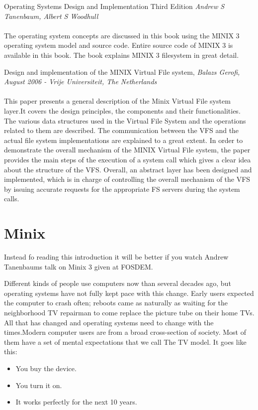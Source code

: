 Operating Systems Design and Implementation Third Edition { \em Andrew S Tanenbaum, Albert S Woodhull }\cite{ast}
\\
\\
The operating system concepts are discussed in this book using the MINIX 3 operating system model and source code. Entire source code of MINIX 3 is available in this book. The book explains MINIX 3 filesystem in great detail. 


\vspace{10mm}
 Design and implementation of the MINIX Virtual File system, { \em Balazs Gerofi, August 2006 - Vrije Universiteit, The Netherlands
}\cite{vfs}
\\
\\
This paper presents a general description of the Minix Virtual File system layer.It covers the design principles, the components and their functionalities.
The various data structures used in the Virtual File System and the operations related to them are described. The communication between the VFS and the actual file system implementations are explained to a great extent.
In order to demonstrate the overall mechanism of the MINIX Virtual File system, the paper provides the main steps of the execution of a system call which gives a clear idea about the structure of the VFS.
Overall, an abstract layer has been designed and implemented, which is in charge of controlling the overall mechanism of the VFS by issuing accurate requests for the appropriate FS servers during the system calls.


\section{Minix}



Instead fo reading this introduction it will be better if you watch Andrew Tanenbaums talk on Minix 3 given at FOSDEM.

Different kinds of people use computers now than sev­eral decades ago, but operating systems have not fully kept pace with this change. Early users expected the computer to crash often; reboots came as naturally as waiting for the neighborhood TV re­pairman to come replace the picture tube on their home TVs. All that has changed and operating systems need to change with the times.Modern computer users are from a broad cross-section of society. Most of them have a set of mental expectations that we call The TV model.
It goes like this:
\begin{itemize}
\item You buy the device.
\item You turn it on.
\item It works perfectly for the next 10 years.
\end{itemize}

